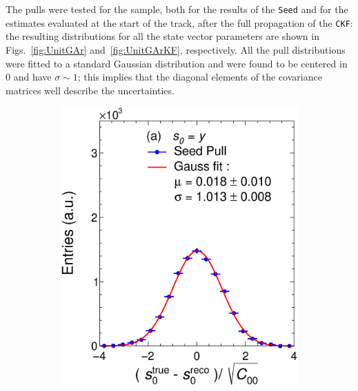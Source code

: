 The pulls were tested for the sample, both for the results of the \texttt{Seed} and for the estimates evaluated at the start of the track, after the full propagation of the \texttt{CKF}: the resulting distributions for all the state vector parameters are shown in Figs.~\ref{fig:UnitGAr} and~\ref{fig:UnitGArKF}, respectively. All the pull distributions were fitted to a standard Gaussian distribution and were found to be centered in 0 and have $\sigma\sim1$; this implies that the diagonal elements of the covariance matrices well describe the uncertainties. 

\begin{figure}[!ht]
     \centering
     \begin{subfigure}{0.32\textwidth}
         \centering
         \includegraphics[width=\textwidth]{figures/ch4-KF_NDGArLite/MC/ALICE+KF/UnitSeed_p0.eps}
         \caption{}
         \label{fig:resp0SeedGAr}
     \end{subfigure}
     \begin{subfigure}{0.32\textwidth}
         \centering

\end{subfigure}
\end{figure}
